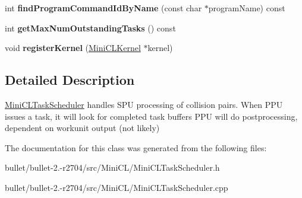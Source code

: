 \begin{DoxyCompactItemize}
\item 
\hypertarget{class_mini_c_l_task_scheduler_a4046f4cd389d0b7ba023057c1a3dc2b6}{int {\bfseries find\+Program\+Command\+Id\+By\+Name} (const char $\ast$program\+Name) const }\label{class_mini_c_l_task_scheduler_a4046f4cd389d0b7ba023057c1a3dc2b6}

\item 
\hypertarget{class_mini_c_l_task_scheduler_a4e20aef39d0ac9c938d1e2e7f46e9b2d}{int {\bfseries get\+Max\+Num\+Outstanding\+Tasks} () const }\label{class_mini_c_l_task_scheduler_a4e20aef39d0ac9c938d1e2e7f46e9b2d}

\item 
\hypertarget{class_mini_c_l_task_scheduler_aeba8cfc17be247623d84e56f735baf0c}{void {\bfseries register\+Kernel} (\hyperlink{struct_mini_c_l_kernel}{Mini\+C\+L\+Kernel} $\ast$kernel)}\label{class_mini_c_l_task_scheduler_aeba8cfc17be247623d84e56f735baf0c}

\end{DoxyCompactItemize}


\subsection{Detailed Description}
\hyperlink{class_mini_c_l_task_scheduler}{Mini\+C\+L\+Task\+Scheduler} handles S\+P\+U processing of collision pairs. When P\+P\+U issues a task, it will look for completed task buffers P\+P\+U will do postprocessing, dependent on workunit output (not likely) 

The documentation for this class was generated from the following files\+:\begin{DoxyCompactItemize}
\item 
bullet/bullet-\/2.-\/r2704/src/\+Mini\+C\+L/Mini\+C\+L\+Task\+Scheduler.\+h\item 
bullet/bullet-\/2.-\/r2704/src/\+Mini\+C\+L/Mini\+C\+L\+Task\+Scheduler.\+cpp\end{DoxyCompactItemize}

